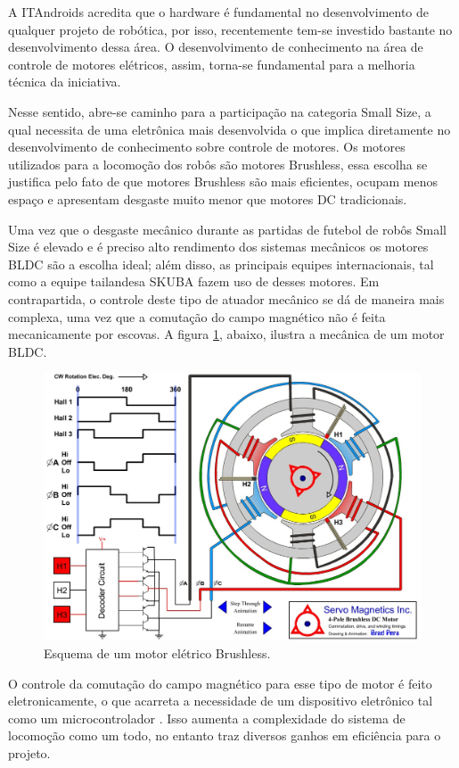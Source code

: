 \documentclass[a4paper,11pt]{article}
\begin{document}
		A ITAndroids acredita que o hardware é fundamental no desenvolvimento de qualquer projeto de robótica, por isso, recentemente tem-se investido bastante no desenvolvimento dessa área. O desenvolvimento de conhecimento na área de controle de motores elétricos, assim, torna-se fundamental para a melhoria técnica da iniciativa.
		
		Nesse sentido, abre-se caminho para a participação na categoria Small Size, a qual necessita de uma eletrônica mais desenvolvida o que implica diretamente no desenvolvimento de conhecimento sobre controle de motores. Os motores utilizados para a locomoção dos robôs são motores Brushless, essa escolha se justifica pelo fato de que motores Brushless são mais eficientes, ocupam menos espaço e apresentam desgaste muito menor que motores DC tradicionais.
		
		Uma vez que o desgaste mecânico durante as partidas de futebol de robôs Small Size é elevado e é preciso alto rendimento dos sistemas mecânicos os motores BLDC são a escolha ideal; além disso, as principais equipes internacionais, tal como a equipe tailandesa SKUBA\cite{skuba} fazem uso de desses motores. Em contrapartida, o controle deste tipo de atuador mecânico se dá de maneira mais complexa, uma vez que a comutação do campo magnético não é feita mecanicamente por escovas. A figura \ref{fig:esquemamotor}, abaixo, ilustra a mecânica de um motor BLDC.
		
		\begin{figure}[ht]
			\centering
			\includegraphics[width=0.7\linewidth]{images/4-Pole-brushless-DC-motor-animation}
			\caption{Esquema de um motor elétrico Brushless.}
			\label{fig:esquemamotor}
		\end{figure}
		
		
		O controle da comutação do campo magnético para esse tipo de motor é feito eletronicamente, o que acarreta a necessidade de um dispositivo eletrônico tal como um microcontrolador \cite{introducaobldc}. Isso aumenta a complexidade do sistema de locomoção como um todo, no entanto traz diversos ganhos em eficiência para o projeto.
		
\end{document}
